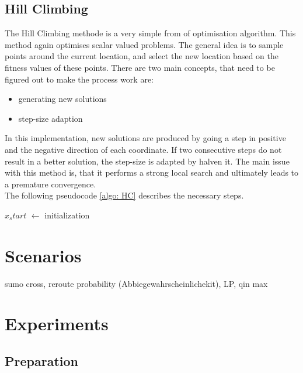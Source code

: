 \documentclass[./\jobname.tex]{subfiles}
\begin{document}
\section{Hill Climbing}

The Hill Climbing methode is a very simple from of optimisation algorithm. This method again optimises scalar valued problems. The general idea is to sample points around the current location, and select the new location based on the fitness values of these points. There are two main concepts, that need to be figured out to make the process work are: 
\begin{itemize}
	\item generating new solutions 
	\item step-size adaption\\
\end{itemize}

In this implementation, new solutions are produced by going a step in positive and the negative direction of each coordinate. If two consecutive steps do not result in a better solution, the step-size is adapted by halven it. The main issue with this method is, that it performs a strong local search and ultimately leads to a premature convergence. \\

The following pseudocode \ref{algo: HC} describes the necessary steps. 

\begin{algorithm}[H]
	\SetAlgoNoLine
	\DontPrintSemicolon
	$x_start$ $\gets$ initialization\;
	\label{algo: HC}
\end{algorithm}


\chapter{Scenarios}
sumo cross, reroute probability (Abbiegewahrscheinlichekit), LP, qin max

\chapter{Experiments}

\section{Preparation}
\end{document}

